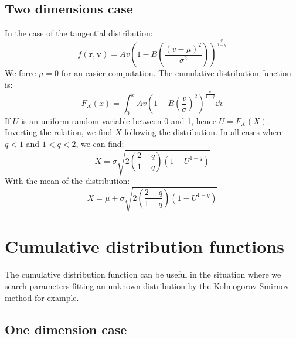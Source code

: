 \subsection{Two dimensions case}
\label{sub:two_dimensions_case}

In the case of the tangential distribution:
%
\begin{equation}
    f\left(\textbf{r},\textbf{v}\right)=A v
    {\left(
        1-B\left(\frac{{\left({v-\mu}\right)}^2}{\sigma^2}\right)
    \right)}^{\frac{q}{1-q}}
\end{equation}
%
We force $\mu=0$ for an easier computation. The cumulative distribution
function is:
%
\begin{equation}
    F_X\left(x\right)=\int_0^x A v
    {\left(1-B{\left(\frac{v}{\sigma}\right)}^2\right)}^{\frac{q}{1-q}}\dd v
\end{equation}
%
If $U$ is an uniform random variable between 0 and 1, hence
$U=F_X\left({X}\right)$. Inverting the relation, we find $X$ following the
distribution. In all cases where $q<1$ and $1<q<2$, we can find:
%
\begin{equation}
    X=\sigma\sqrt{2\left(\frac{2-q}{1-q}\right)\left(1-U^{1-q}\right)}
\end{equation}
%
With the mean of the distribution:
%
\begin{equation}
    X=\mu+\sigma\sqrt{2\left(\frac{2-q}{1-q}\right)\left(1-U^{1-q}\right)}
\end{equation}

\section{Cumulative distribution functions}
\label{sec:cumulative_distribution_functions}

The cumulative distribution function can be useful in the situation where we
search parameters fitting an unknown distribution by the Kolmogorov-Smirnov
method for example.

\subsection{One dimension case}
\label{sub:one_dimension_case}

